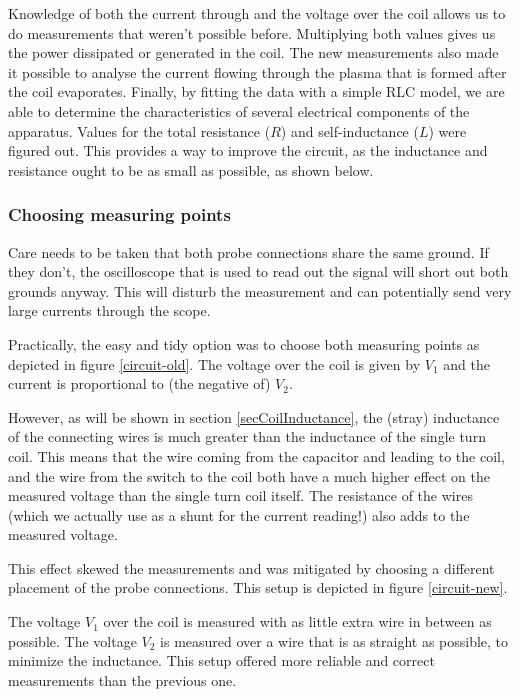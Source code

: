 Knowledge of both the current through and the voltage over the coil allows us 
to do measurements that weren't possible before. Multiplying both values gives 
us the power dissipated or generated in the coil. The new measurements also 
made it possible to analyse the current flowing through the plasma that is 
formed after the coil evaporates. Finally, by fitting the data with a simple 
RLC model, we are able to determine the characteristics of several electrical 
components of the apparatus. Values for the total resistance ($R$) and 
self-inductance ($L$) were figured out. This provides a way to improve the 
circuit, as the inductance and resistance ought to be as small as possible, 
as shown below.

\subsubsection{Choosing measuring points}
Care needs to be taken that both probe connections share the same ground.  
If they don't, the oscilloscope that is used to read out the signal will 
short out both grounds anyway. This will disturb the measurement and can 
potentially send very large currents through the scope.

Practically, the easy and tidy option was to choose both measuring points as 
depicted in figure \ref{circuit-old}. The voltage over the coil is given by 
$V_1$ and the current is proportional to (the negative of) $V_2$.

However, as will be shown in section \ref{secCoilInductance}, the (stray) 
inductance of the connecting wires is much greater than the inductance of 
the single turn coil. This means that the wire coming from the capacitor 
and leading to the coil, and the wire from the switch to the coil both have 
a much higher effect on the measured voltage than the single turn coil 
itself.  The resistance of the wires (which we actually use as a shunt for 
the current reading!) also adds to the measured voltage.

This effect skewed the measurements and was mitigated by choosing a 
different placement of the probe connections. This setup is depicted in 
figure \ref{circuit-new}.


The voltage $V_1$ over the coil is measured with as little extra wire in 
between as possible. The voltage $V_2$ is measured over a wire that is as 
straight as possible, to minimize the inductance. This setup offered more 
reliable and correct measurements than the previous one.

